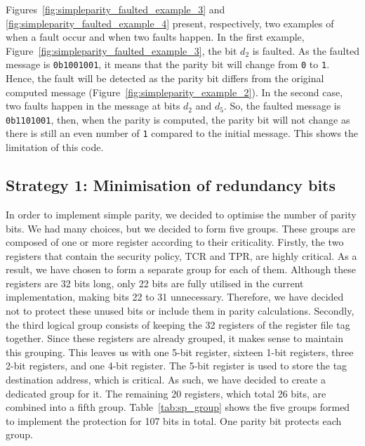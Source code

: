 Figures~\ref{fig:simpleparity_faulted_example_3} and \ref{fig:simpleparity_faulted_example_4} present, respectively, two examples of when a fault occur and when two faults happen.
In the first example, Figure~\ref{fig:simpleparity_faulted_example_3}, the bit $d_2$ is faulted. As the faulted message is \texttt{0b1001001}, it means that the parity bit will change from \texttt{0} to \texttt{1}. Hence, the fault will be detected as the parity bit differs from the original computed message (Figure~\ref{fig:simpleparity_example_2}).
In the second case, two faults happen in the message at bits $d_2$ and $d_5$. So, the faulted message is \texttt{0b1101001}, then, when the parity is computed, the parity bit will not change as there is still an even number of \texttt{1} compared to the initial message. This shows the limitation of this code.

\subsection{Strategy 1: Minimisation of redundancy bits}

In order to implement simple parity, we decided to optimise the number of parity bits. We had many choices, but we decided to form five groups. These groups are composed of one or more register according to their criticality.
Firstly, the two registers that contain the security policy, TCR and TPR, are highly critical. As a result, we have chosen to form a separate group for each of them. Although these registers are 32 bits long, only 22 bits are fully utilised in the current implementation, making bits 22 to 31 unnecessary. Therefore, we have decided not to protect these unused bits or include them in parity calculations.
Secondly, the third logical group consists of keeping the 32 registers of the register file tag together. Since these registers are already grouped, it makes sense to maintain this grouping.
This leaves us with one 5-bit register, sixteen 1-bit registers, three 2-bit registers, and one 4-bit register. The 5-bit register is used to store the tag destination address, which is critical. As such, we have decided to create a dedicated group for it. The remaining 20 registers, which total 26 bits, are combined into a fifth group.
Table~\ref{tab:sp_group} shows the five groups formed to implement the protection for 107 bits in total. One parity bit protects each group.

